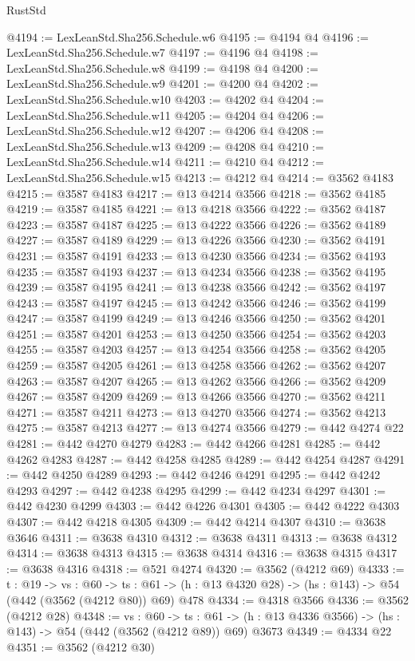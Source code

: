 \begin{lexlean}{RustStd}
\begin{coremodule}
@4194 := LexLeanStd.Sha256.Schedule.w6
@4195 := @4194 @4
@4196 := LexLeanStd.Sha256.Schedule.w7
@4197 := @4196 @4
@4198 := LexLeanStd.Sha256.Schedule.w8
@4199 := @4198 @4
@4200 := LexLeanStd.Sha256.Schedule.w9
@4201 := @4200 @4
@4202 := LexLeanStd.Sha256.Schedule.w10
@4203 := @4202 @4
@4204 := LexLeanStd.Sha256.Schedule.w11
@4205 := @4204 @4
@4206 := LexLeanStd.Sha256.Schedule.w12
@4207 := @4206 @4
@4208 := LexLeanStd.Sha256.Schedule.w13
@4209 := @4208 @4
@4210 := LexLeanStd.Sha256.Schedule.w14
@4211 := @4210 @4
@4212 := LexLeanStd.Sha256.Schedule.w15
@4213 := @4212 @4
@4214 := @3562 @4183
@4215 := @3587 @4183
@4217 := @13 @4214 @3566
@4218 := @3562 @4185
@4219 := @3587 @4185
@4221 := @13 @4218 @3566
@4222 := @3562 @4187
@4223 := @3587 @4187
@4225 := @13 @4222 @3566
@4226 := @3562 @4189
@4227 := @3587 @4189
@4229 := @13 @4226 @3566
@4230 := @3562 @4191
@4231 := @3587 @4191
@4233 := @13 @4230 @3566
@4234 := @3562 @4193
@4235 := @3587 @4193
@4237 := @13 @4234 @3566
@4238 := @3562 @4195
@4239 := @3587 @4195
@4241 := @13 @4238 @3566
@4242 := @3562 @4197
@4243 := @3587 @4197
@4245 := @13 @4242 @3566
@4246 := @3562 @4199
@4247 := @3587 @4199
@4249 := @13 @4246 @3566
@4250 := @3562 @4201
@4251 := @3587 @4201
@4253 := @13 @4250 @3566
@4254 := @3562 @4203
@4255 := @3587 @4203
@4257 := @13 @4254 @3566
@4258 := @3562 @4205
@4259 := @3587 @4205
@4261 := @13 @4258 @3566
@4262 := @3562 @4207
@4263 := @3587 @4207
@4265 := @13 @4262 @3566
@4266 := @3562 @4209
@4267 := @3587 @4209
@4269 := @13 @4266 @3566
@4270 := @3562 @4211
@4271 := @3587 @4211
@4273 := @13 @4270 @3566
@4274 := @3562 @4213
@4275 := @3587 @4213
@4277 := @13 @4274 @3566
@4279 := @442 @4274 @22
@4281 := @442 @4270 @4279
@4283 := @442 @4266 @4281
@4285 := @442 @4262 @4283
@4287 := @442 @4258 @4285
@4289 := @442 @4254 @4287
@4291 := @442 @4250 @4289
@4293 := @442 @4246 @4291
@4295 := @442 @4242 @4293
@4297 := @442 @4238 @4295
@4299 := @442 @4234 @4297
@4301 := @442 @4230 @4299
@4303 := @442 @4226 @4301
@4305 := @442 @4222 @4303
@4307 := @442 @4218 @4305
@4309 := @442 @4214 @4307
@4310 := @3638 @3646
@4311 := @3638 @4310
@4312 := @3638 @4311
@4313 := @3638 @4312
@4314 := @3638 @4313
@4315 := @3638 @4314
@4316 := @3638 @4315
@4317 := @3638 @4316
@4318 := @521 @4274
@4320 := @3562 (@4212 @69)
@4333 := {t : @19} ->
  {vs : @60} ->
  {ts : @61} -> (h : @13 @4320 @28) -> (hs : @143) -> @54 (@442 (@3562 (@4212 @80)) @69) @478
@4334 := @4318 @3566
@4336 := @3562 (@4212 @28)
@4348 := {vs : @60} ->
  {ts : @61} -> (h : @13 @4336 @3566) -> (hs : @143) -> @54 (@442 (@3562 (@4212 @89)) @69) @3673
@4349 := @4334 @22
@4351 := @3562 (@4212 @30)

\end{coremodule}
\end{lexlean}
